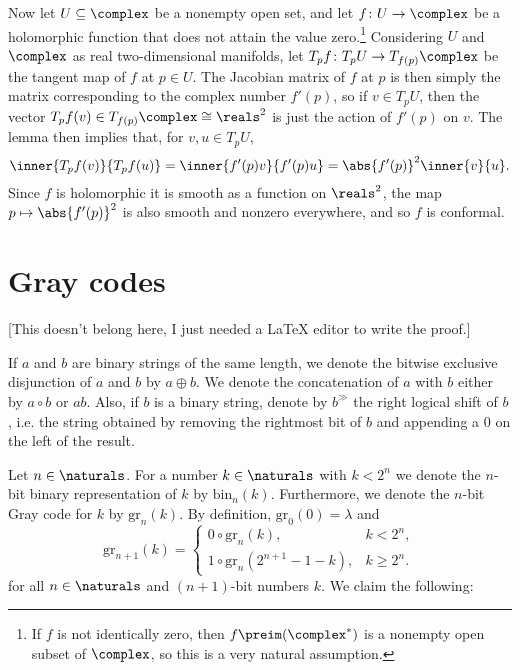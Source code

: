 \documentclass[article, a4paper, 11pt, oneside]{memoir}
\numberwithin{equation}{chapter}
\begin{document}
Now let $U \subseteq \complex$ be a nonempty open set, and let $f \colon U \to \complex$ be a holomorphic function that does not attain the value zero.\footnote{If $f$ is not identically zero, then $f\preim(\complex^*)$ is a nonempty open subset of $\complex$, so this is a very natural assumption.} Considering $U$ and $\complex$ as real two-dimensional manifolds, let $T_p f \colon T_p U \to T_{f(p)} \complex$ be the tangent map of $f$ at $p \in U$. The Jacobian matrix of $f$ at $p$ is then simply the matrix corresponding to the complex number $f'(p)$, so if $v \in T_p U$, then the vector $T_p f(v) \in T_{f(p)} \complex \cong \reals^2$ is just the action of $f'(p)$ on $v$. The lemma then implies that, for $v,u \in T_p U$,
%
\begin{equation*}
    \inner{T_p f(v)}{T_p f(u)}
        = \inner{f'(p)v}{f'(p)u}
        = \abs{f'(p)}^2 \inner{v}{u}.
\end{equation*}
%
Since $f$ is holomorphic it is smooth as a function on $\reals^2$, the map $p \mapsto \abs{f'(p)}^2$ is also smooth and nonzero everywhere, and so $f$ is conformal.


\chapter{Gray codes}

\newcommand{\bin}[2][]{\mathrm{bin}_{#1}(#2)}
\newcommand{\gray}[2][]{\mathrm{gr}_{#1}(#2)}
\newcommand{\xor}{\oplus}
\newcommand{\shiftr}{^{\gg}}
\newcommand{\conc}{\circ}
\newcommand{\emptystring}{\lambda}

[This doesn't belong here, I just needed a LaTeX editor to write the proof.]

If $a$ and $b$ are binary strings of the same length, we denote the bitwise exclusive disjunction of $a$ and $b$ by $a \xor b$. We denote the concatenation of $a$ with $b$ either by $a \conc b$ or $ab$. Also, if $b$ is a binary string, denote by $b\shiftr$ the right logical shift of $b$, i.e. the string obtained by removing the rightmost bit of $b$ and appending a $0$ on the left of the result.

Let $n \in \naturals$. For a number $k \in \naturals$ with $k < 2^n$ we denote the $n$-bit binary representation of $k$ by $\bin[n]{k}$. Furthermore, we denote the $n$-bit Gray code for $k$ by $\gray[n]{k}$. By definition, $\gray[0]{0} = \emptystring$ and
%
\begin{equation*}
    \gray[n+1]{k}
        = \begin{cases}
            0 \conc \gray[n]{k},           & k < 2^n,    \\
            1 \conc \gray[n]{2^{n+1}-1-k}, & k \geq 2^n.
        \end{cases}
\end{equation*}
%
for all $n \in \naturals$ and $(n+1)$-bit numbers $k$. We claim the following:
\end{document}
